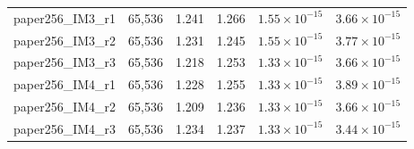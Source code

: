 \begin{center}
{\begin{tabular}{@{}lrrrrr@{}}
paper256\_IM3\_r1 & 65,536 & 1.241 & 1.266 & $1.55\times10^{-15}$ & $3.66\times10^{-15}$ \\
paper256\_IM3\_r2 & 65,536 & 1.231 & 1.245 & $1.55\times10^{-15}$ & $3.77\times10^{-15}$ \\
paper256\_IM3\_r3 & 65,536 & 1.218 & 1.253 & $1.33\times10^{-15}$ & $3.66\times10^{-15}$ \\
paper256\_IM4\_r1 & 65,536 & 1.228 & 1.255 & $1.33\times10^{-15}$ & $3.89\times10^{-15}$ \\
paper256\_IM4\_r2 & 65,536 & 1.209 & 1.236 & $1.33\times10^{-15}$ & $3.66\times10^{-15}$ \\
paper256\_IM4\_r3 & 65,536 & 1.234 & 1.237 & $1.33\times10^{-15}$ & $3.44\times10^{-15}$ \\
\bottomrule
\end{tabular}}
\end{center}
